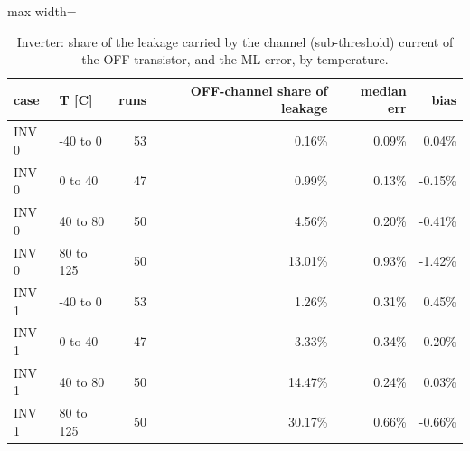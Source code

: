 \begin{table}[H]
\centering
{\small
\begin{adjustbox}{max width=\linewidth}
\begin{tabular}{llrrrr}
\toprule
case & T [C] & runs & OFF-channel share of leakage & median err & bias \\
\midrule
INV 0 & -40 to 0 & 53 & 0.16\% & 0.09\% & 0.04\% \\
INV 0 & 0 to 40 & 47 & 0.99\% & 0.13\% & -0.15\% \\
INV 0 & 40 to 80 & 50 & 4.56\% & 0.20\% & -0.41\% \\
INV 0 & 80 to 125 & 50 & 13.01\% & 0.93\% & -1.42\% \\
INV 1 & -40 to 0 & 53 & 1.26\% & 0.31\% & 0.45\% \\
INV 1 & 0 to 40 & 47 & 3.33\% & 0.34\% & 0.20\% \\
INV 1 & 40 to 80 & 50 & 14.47\% & 0.24\% & 0.03\% \\
INV 1 & 80 to 125 & 50 & 30.17\% & 0.66\% & -0.66\% \\
\bottomrule
\end{tabular}
\end{adjustbox}
}
\caption{Inverter: share of the leakage carried by the channel (sub-threshold) current of the OFF transistor, and the ML error, by temperature.}
\label{tab:offshare}
\end{table}

